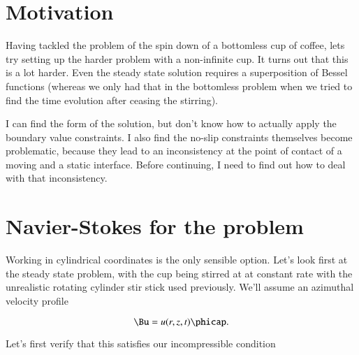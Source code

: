 %
%
%
%
%
%
%
%
%
%
%
%
\label{chap:coffeeCupWithBottom}
\section{Motivation}

Having tackled the problem of the spin down of a bottomless cup of coffee, lets try setting up the harder problem with a non-infinite cup.  It turns out that this is a lot harder.  Even the steady state solution requires a superposition of Bessel functions (whereas we only had that in the bottomless problem when we tried to find the time evolution after ceasing the stirring).  

I can find the form of the solution, but don't know how to actually apply the boundary value constraints.  I also find the no-slip constraints themselves become problematic, because they lead to an inconsistency at the point of contact of a moving and a static interface.  Before continuing, I need to find out how to deal with that inconsistency.

\section{Navier-Stokes for the problem}

Working in cylindrical coordinates is the only sensible option.  Let's look first at the steady state problem, with the cup being stirred at at constant rate with the unrealistic rotating cylinder  stir stick used previously.  We'll assume an azimuthal velocity profile

\begin{equation}\label{eqn:coffeeCupWithBottom:10}
\Bu = u(r, z, t) \phicap.
\end{equation}

Let's first verify that this satisfies our incompressible condition

